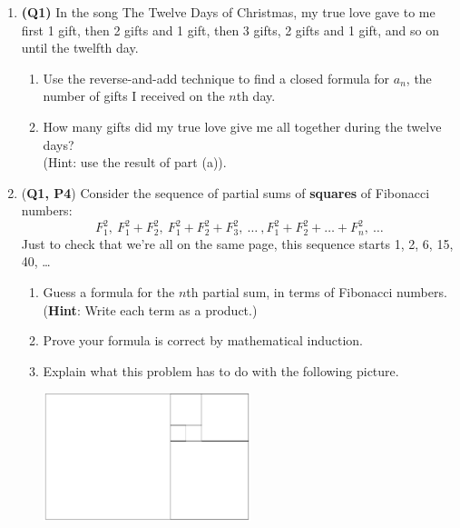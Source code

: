 \documentclass[12pt]{article}
\begin{document}
\begin{enumerate}
\begin{enumerate}
\end{enumerate}

\item \textbf{(Q1)} In the song The Twelve Days of Christmas, my true love gave to me first 1 gift, then 2 gifts and 1 gift, then 3 gifts, 2 gifts and 1 gift, and so on until the twelfth day. 
\begin{enumerate}
    \item Use the reverse-and-add technique to find a closed formula for $a_n$, the number of gifts I received on the $n$th day.
    \item How many gifts did my true love give me all together during the twelve days? \\(Hint: use the result of part (a)).
\end{enumerate}

\item (\textbf{Q1, P4}) Consider the sequence of partial sums of \textbf{squares} of Fibonacci numbers: 
\[F_1^2,\ F_1^2 + F_2^2,\ F_1^2+F_2^2 + F_3^2,\ \ldots\ , F_1^2+F_2^2 + \ldots + F_n^2,\ \ldots\]
Just to check that we're all on the same page, this sequence starts 1, 2, 6, 15, 40, \ldots
\begin{enumerate}
    \item Guess a formula for the $n$th partial sum, in terms of Fibonacci numbers. \\(\textbf{Hint}: Write each term as a product.) 
    
    \item Prove your formula is correct by mathematical induction.
    
    \item Explain what this problem has to do with the following picture.
\begin{center}
\includegraphics[width=0.5\textwidth]{golden-rectangles.png}
\end{center}
    
\end{enumerate}



\end{enumerate}
\end{document}
